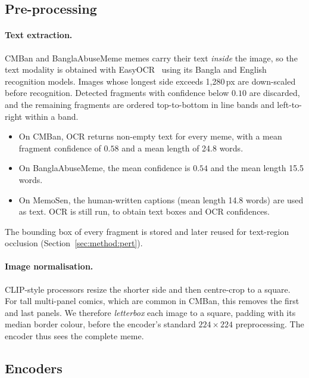 \subsection{Pre-processing}
\label{sec:method:prep}

\paragraph{Text extraction.}
CMBan and BanglaAbuseMeme memes carry their text \emph{inside} the image, so the text modality is obtained with
EasyOCR~\cite{easyocr} using its Bangla and English recognition models. Images whose longest side exceeds
1{,}280\,px are down-scaled before recognition. Detected fragments with confidence below $0.10$ are discarded, and
the remaining fragments are ordered top-to-bottom in line bands and left-to-right within a band.
\begin{itemize}
  \item On CMBan, OCR returns non-empty text for every meme, with a mean fragment confidence of $0.58$ and a mean
  length of 24.8 words.
  \item On BanglaAbuseMeme, the mean confidence is $0.54$ and the mean length 15.5 words.
  \item On MemoSen, the human-written captions (mean length 14.8 words) are used as text. OCR is still run, to obtain
  text boxes and OCR confidences.
\end{itemize}
The bounding box of every fragment is stored and later reused for text-region occlusion
(Section~\ref{sec:method:pert}).

\paragraph{Image normalisation.}
CLIP-style processors resize the shorter side and then centre-crop to a square. For tall multi-panel comics, which
are common in CMBan, this removes the first and last panels. We therefore \emph{letterbox} each image to a square,
padding with its median border colour, before the encoder's standard $224\times224$ preprocessing. The encoder thus
sees the complete meme.

\subsection{Encoders}
\label{sec:method:enc}

